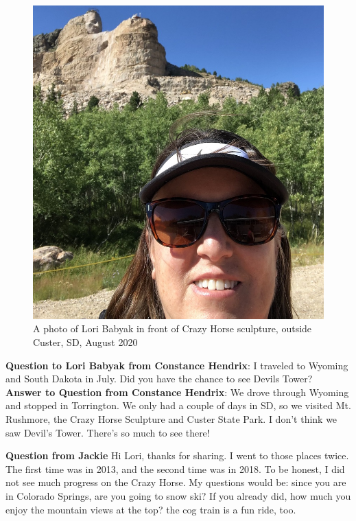 \begin{figure} [h!]
    \centering
    \includegraphics[width=.4\textwidth]{LoriSDSmall.JPG} 
    \caption{A photo of Lori Babyak in front of Crazy Horse sculpture, outside Custer, SD, August 2020}
\end{figure}


\textbf{Question  to Lori Babyak from Constance Hendrix}:  I traveled to Wyoming and South Dakota in July.  Did you have the chance to see Devils Tower?
\textbf{Answer to Question from Constance Hendrix}: We drove through Wyoming and stopped in Torrington.  We only had a couple of days in SD, so we visited Mt. Rushmore, the Crazy Horse Sculpture and Custer State Park.  I don't think we saw Devil's Tower. There's so much to see there!

\textbf{Question from Jackie}
Hi Lori, thanks for sharing. I went to those places twice. The first time was in 2013, and the second time was in 2018. To be honest, I did not see much progress on the Crazy Horse. My questions would be: since you are in Colorado Springs, are you going to snow ski? If you already did, how much you enjoy the mountain views at the top? the cog train is a fun ride, too. 

